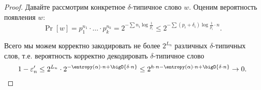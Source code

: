 \begin{proof}
    Давайте рассмотрим конкретное $\delta$-типичное слово $w$. Оценим вероятность появления $w$:
    $$
        \Pr[w] = p_1^{n_1} \cdot \dots \cdot p_k^{n_k}
        = 2^{-\sum n_i \log\frac{1}{p_i}} \le 2^{-\sum (p_i + \delta_i) \log\frac{1}{p_i} \cdot n}.
    $$

    Всего мы можем корректно закодировать не более $2^{L_n}$ различных $\delta$-типичных слов,
    т.е. вероятность корректно декодировать $\delta$-типичное слово
    $$
        1 - \varepsilon'_n \le 2^{L_n} \cdot 2^{-\entropy(\alpha) \cdot n + \bigO{\delta \cdot n}} \le
        2^{h \cdot n - \entropy(\alpha) \cdot n + \bigO{\delta \cdot n}} \to 0.
    $$
\end{proof}
